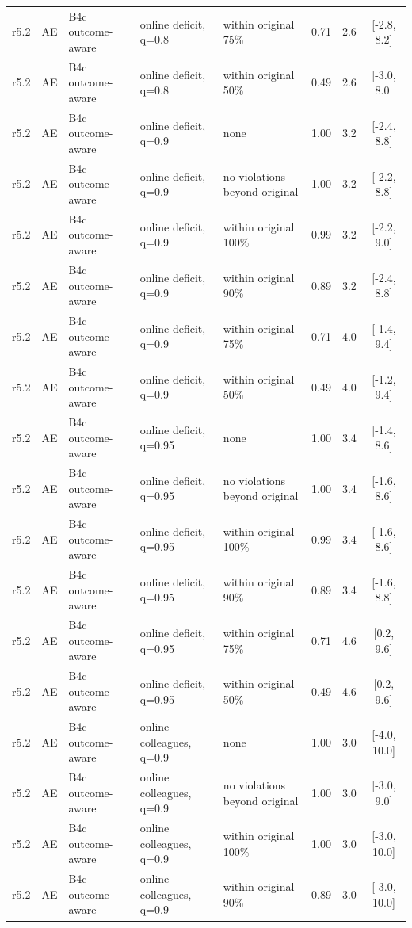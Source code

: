 \begin{longtable}{lllp{4.2cm}p{3.4cm}ccc}
r5.2 & AE & B4c outcome-aware & online deficit, q=0.8 & within original 75\% & 0.71 & 2.6 & [-2.8, 8.2] \\
r5.2 & AE & B4c outcome-aware & online deficit, q=0.8 & within original 50\% & 0.49 & 2.6 & [-3.0, 8.0] \\
r5.2 & AE & B4c outcome-aware & online deficit, q=0.9 & none & 1.00 & 3.2 & [-2.4, 8.8] \\
r5.2 & AE & B4c outcome-aware & online deficit, q=0.9 & no violations beyond original & 1.00 & 3.2 & [-2.2, 8.8] \\
r5.2 & AE & B4c outcome-aware & online deficit, q=0.9 & within original 100\% & 0.99 & 3.2 & [-2.2, 9.0] \\
r5.2 & AE & B4c outcome-aware & online deficit, q=0.9 & within original 90\% & 0.89 & 3.2 & [-2.4, 8.8] \\
r5.2 & AE & B4c outcome-aware & online deficit, q=0.9 & within original 75\% & 0.71 & 4.0 & [-1.4, 9.4] \\
r5.2 & AE & B4c outcome-aware & online deficit, q=0.9 & within original 50\% & 0.49 & 4.0 & [-1.2, 9.4] \\
r5.2 & AE & B4c outcome-aware & online deficit, q=0.95 & none & 1.00 & 3.4 & [-1.4, 8.6] \\
r5.2 & AE & B4c outcome-aware & online deficit, q=0.95 & no violations beyond original & 1.00 & 3.4 & [-1.6, 8.6] \\
r5.2 & AE & B4c outcome-aware & online deficit, q=0.95 & within original 100\% & 0.99 & 3.4 & [-1.6, 8.6] \\
r5.2 & AE & B4c outcome-aware & online deficit, q=0.95 & within original 90\% & 0.89 & 3.4 & [-1.6, 8.8] \\
r5.2 & AE & B4c outcome-aware & online deficit, q=0.95 & within original 75\% & 0.71 & 4.6 & [0.2, 9.6] \\
r5.2 & AE & B4c outcome-aware & online deficit, q=0.95 & within original 50\% & 0.49 & 4.6 & [0.2, 9.6] \\
r5.2 & AE & B4c outcome-aware & online colleagues, q=0.9 & none & 1.00 & 3.0 & [-4.0, 10.0] \\
r5.2 & AE & B4c outcome-aware & online colleagues, q=0.9 & no violations beyond original & 1.00 & 3.0 & [-3.0, 9.0] \\
r5.2 & AE & B4c outcome-aware & online colleagues, q=0.9 & within original 100\% & 1.00 & 3.0 & [-3.0, 10.0] \\
r5.2 & AE & B4c outcome-aware & online colleagues, q=0.9 & within original 90\% & 0.89 & 3.0 & [-3.0, 10.0] \\

\end{longtable}
